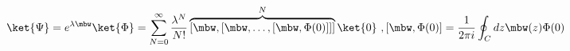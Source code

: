 \begin{equation}
\ket{\Psi}=e^{\lambda\mbw}\ket{\Phi}=
\sum_{N=0}^{\infty}\frac{\lambda^N}
{N!}\overbrace{
[\mbw,[\mbw,\dots,[\mbw,\Phi(0)]]]}^{N}\ket{0} \ ,
[\mbw,\Phi(0)]=\frac{1}{2\pi i}\oint_C dz \mbw(z)
\Phi(0)  
\end{equation}

